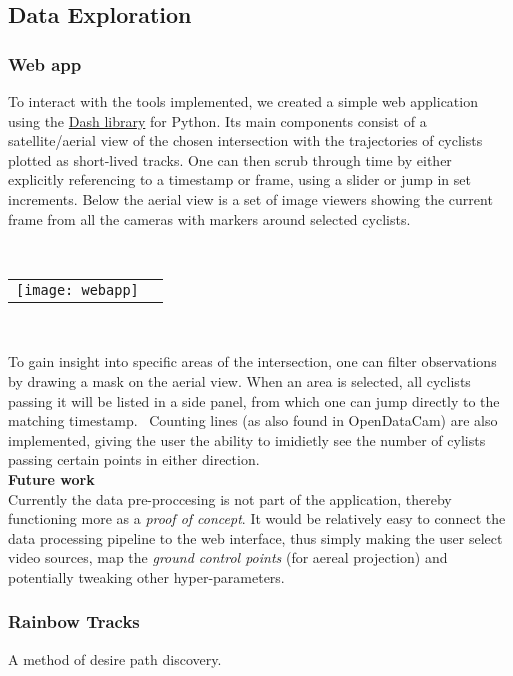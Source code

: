 \subsection{Data Exploration}

\subsubsection{Web app}
To interact with the tools implemented, we created a simple web application using the \href{https://plotly.com/dash/}{Dash library} for Python. 
Its main components consist of a satellite/aerial view of the chosen intersection with the trajectories of cyclists plotted as short-lived tracks. 
One can then scrub through time by either explicitly referencing to a timestamp or frame, using a slider or jump in set increments.
Below the aerial view is a set of image viewers showing the current frame from all the cameras with markers around selected cyclists.

\ \\ 
\raggedbottom
\begin{tabular}{@{}cc}
\texttt{[image: webapp]} 
\end{tabular}
\label{webapp}
\

To gain insight into specific areas of the intersection, one can filter observations by drawing a mask on the aerial view. 
When an area is selected, all cyclists passing it will be listed in a side panel, from which one can jump directly to the matching timestamp.
\
Counting lines (as also found in OpenDataCam) are also implemented, giving the user the ability to imidietly see the number of 
cylists passing certain points in either direction.
\ \\

\textbf{Future work} \\
Currently the data pre-proccesing is not part of the application, thereby functioning more as a \textit{proof of concept}.
It would be relatively easy to connect the data processing pipeline to the web interface, thus simply making the user 
select video sources, map the \textit{ground control points} (for aereal projection) and potentially tweaking other hyper-parameters. 

\subsubsection{Rainbow Tracks}
A method of desire path discovery.

